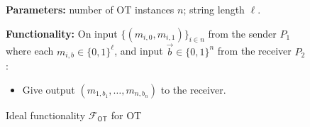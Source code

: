 \documentclass[a4paper,10pt]{article}
\newcommand{\FuncOT}{\mathcal{F}_\mathsf{OT}}
\begin{document}
\begin{figure}[!hbtp]
\begin{framed}
\begin{minipage}[center]{\textwidth}
\begin{trivlist}
\item \textbf{Parameters:} number of OT instances $n$; string length $\ell$. 

\item \textbf{Functionality:}
On input $\{(m_{i,0}, m_{i,1})\}_{i \in n}$ from the sender $P_1$ 
where each $m_{i,b} \in \{0,1\}^\ell$, and input $\vec{b} \in \{0,1\}^n$ from the receiver $P_2$: 
\begin{itemize}
\item Give output $(m_{1,b_1}, \dots, m_{n,b_n})$ to the receiver. 
\end{itemize}
\end{trivlist}
\end{minipage}
\end{framed}
\caption{Ideal functionality $\FuncOT$ for OT}\label{fig:fot}
\end{figure}
\end{document}

